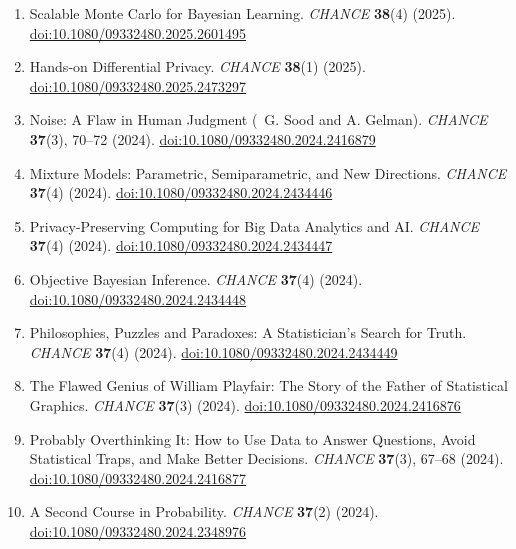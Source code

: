 \medskip
\medskip
\begin{enumerate}
\renewcommand{\theenumi}{[R-\arabic{enumi}]}
\item Scalable Monte Carlo for Bayesian Learning. {\em CHANCE} {\bf 38}(4) (2025).
\href{https://doi.org/10.1080/09332480.2025.2601495}{doi:10.1080/09332480.2025.2601495}

\item Hands-on Differential Privacy. {\em CHANCE} {\bf 38}(1) (2025).
\href{https://doi.org/10.1080/09332480.2025.2473297}{doi:10.1080/09332480.2025.2473297}

\item Noise: A Flaw in Human Judgment (\avec~G. Sood and A. Gelman). {\em CHANCE} {\bf 37}(3), 70--72 (2024).
\href{https://doi.org/10.1080/09332480.2024.2416879}{doi:10.1080/09332480.2024.2416879}

\item Mixture Models: Parametric, Semiparametric, and New Directions. {\em CHANCE} {\bf 37}(4) (2024).
\href{https://doi.org/10.1080/09332480.2024.2434446}{doi:10.1080/09332480.2024.2434446}

\item Privacy-Preserving Computing for Big Data Analytics and AI. {\em CHANCE} {\bf 37}(4) (2024).
\href{https://doi.org/10.1080/09332480.2024.2434447}{doi:10.1080/09332480.2024.2434447}

\item Objective Bayesian Inference. {\em CHANCE} {\bf 37}(4) (2024).
\href{https://doi.org/10.1080/09332480.2024.2434448}{doi:10.1080/09332480.2024.2434448}

\item Philosophies, Puzzles and Paradoxes: A Statistician's Search for Truth. {\em CHANCE} {\bf 37}(4) (2024).
\href{https://doi.org/10.1080/09332480.2024.2434449}{doi:10.1080/09332480.2024.2434449}

\item The Flawed Genius of William Playfair: The Story of the Father of Statistical Graphics. {\em CHANCE} {\bf 37}(3) (2024).
\href{https://doi.org/10.1080/09332480.2024.2416876}{doi:10.1080/09332480.2024.2416876}

\item Probably Overthinking It: How to Use Data to Answer Questions, Avoid Statistical Traps, and Make Better Decisions. {\em CHANCE} {\bf 37}(3), 67--68 (2024).
\href{https://doi.org/10.1080/09332480.2024.2416877}{doi:10.1080/09332480.2024.2416877}

\item A Second Course in Probability. {\em CHANCE} {\bf 37}(2) (2024).
\href{https://doi.org/10.1080/09332480.2024.2348976}{doi:10.1080/09332480.2024.2348976}


\end{enumerate}
